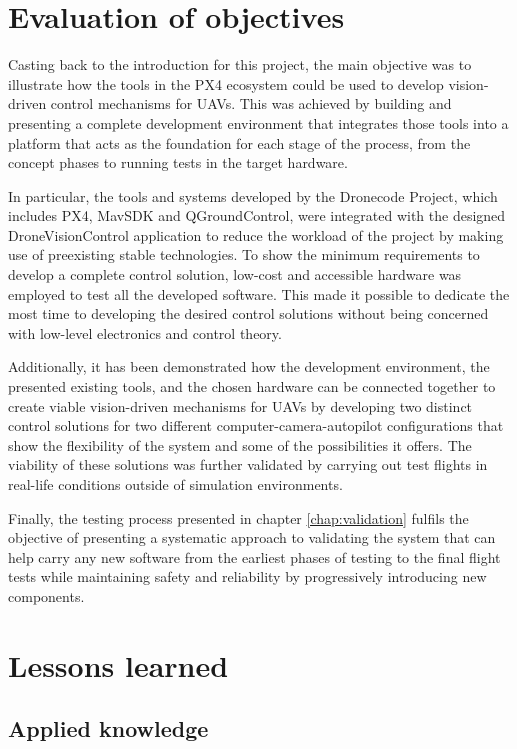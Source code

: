 \section{Evaluation of objectives}
\label{sec:consecucion-objetivos}

Casting back to the introduction for this project, the main objective was to illustrate how the tools in the PX4 ecosystem could be used to develop vision-driven control mechanisms for UAVs.
This was achieved by building and presenting a complete development environment that integrates those tools into a platform that acts as the foundation for each stage of the process, from the concept phases to running tests in the target hardware.

In particular, the tools and systems developed by the Dronecode Project, which includes PX4, MavSDK and QGroundControl, were integrated with the designed DroneVisionControl application to reduce the workload of the project by making use of preexisting stable technologies. To show the minimum requirements to develop a complete control solution, low-cost and accessible hardware was employed to test all the developed software. This made it possible to dedicate the most time to developing the desired control solutions without being concerned with low-level electronics and control theory.

Additionally, it has been demonstrated how the development environment, the presented existing tools, and the chosen hardware can be connected together to create viable vision-driven mechanisms for UAVs by developing two distinct control solutions for two different computer-camera-autopilot configurations that show the flexibility of the system and some of the possibilities it offers. The viability of these solutions was further validated by carrying out test flights in real-life conditions outside of simulation environments.

Finally, the testing process presented in chapter \ref{chap:validation} fulfils the objective of presenting a systematic approach to validating the system that can help carry any new software from the earliest phases of testing to the final flight tests while maintaining safety and reliability by progressively introducing new components. 


\section{Lessons learned}
\label{sec:lessons-learned}

\subsection{Applied knowledge}

